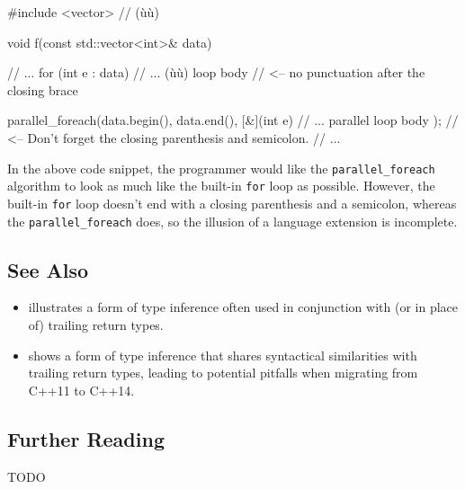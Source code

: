 \begin{emcppslisting}
#include <vector>  // (ù{}ù)

void f(const std::vector<int>& data)
{
    // ...
    for (int e : data)
    {
        // ...             (ù{}ù) loop body
    }  // <-- no punctuation after the closing brace

    parallel_foreach(data.begin(), data.end(), [&](int e)
    {
        // ...             parallel loop body
    });  // <-- Don't forget the closing parenthesis and semicolon.
    // ...
}
\end{emcppslisting}
    

In the above code snippet, the programmer would like the
\lstinline!parallel_foreach! algorithm to look as much like the built-in
\lstinline!for! loop as possible. However, the built-in \lstinline!for! loop
doesn't end with a closing parenthesis and a semicolon, whereas the
\lstinline!parallel_foreach! does, so the illusion of a language extension
is incomplete.

\subsection[See Also]{See Also}\label{see-also}

\begin{itemize}
\item{illustrates a form of type inference often used in conjunction with (or in place of) trailing return types.}
\item{shows a form of type inference that shares syntactical similarities with trailing return types, leading to potential pitfalls when migrating from C++11 to C++14.}
\end{itemize}

\subsection[Further Reading]{Further Reading}\label{further-reading}

TODO

